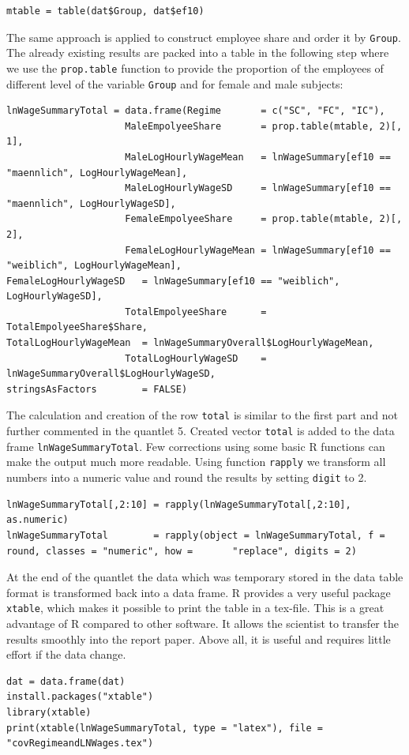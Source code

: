 \lstset{firstnumber = 347} 
\begin{lstlisting}
mtable = table(dat$Group, dat$ef10)                                            
\end{lstlisting}
The same approach is applied to construct employee share and order it by \texttt{Group}. The already existing results are packed into a table in the following step where we use the \texttt{prop.table} function to provide the proportion of the employees of different level of the variable \texttt{Group} and for female and male subjects:
\lstset{firstnumber = 356} 
\begin{lstlisting}
lnWageSummaryTotal = data.frame(Regime       = c("SC", "FC", "IC"),                                   
                     MaleEmpolyeeShare       = prop.table(mtable, 2)[, 1],  
                     MaleLogHourlyWageMean   = lnWageSummary[ef10 == "maennlich", LogHourlyWageMean],    
                     MaleLogHourlyWageSD     = lnWageSummary[ef10 == "maennlich", LogHourlyWageSD],       
                     FemaleEmpolyeeShare     = prop.table(mtable, 2)[, 2],                             
                     FemaleLogHourlyWageMean = lnWageSummary[ef10 == "weiblich", LogHourlyWageMean],                            FemaleLogHourlyWageSD   = lnWageSummary[ef10 == "weiblich", LogHourlyWageSD],     
                     TotalEmpolyeeShare      = TotalEmpolyeeShare$Share,                                                        TotalLogHourlyWageMean  = lnWageSummaryOverall$LogHourlyWageMean,                
                     TotalLogHourlyWageSD    = lnWageSummaryOverall$LogHourlyWageSD,                                            stringsAsFactors        = FALSE)                                          
\end{lstlisting}
The calculation and creation of the row \texttt{total} is similar to the first part and not further commented in the quantlet 5. Created vector \texttt{total} is added to the data frame \texttt{lnWageSummaryTotal}. Few corrections using some basic R functions can make the output much more readable. Using function \texttt{rapply} we transform all numbers into a numeric value and round the results by setting \texttt{digit} to 2.
\lstset{firstnumber = 401} 
\begin{lstlisting}
lnWageSummaryTotal[,2:10] = rapply(lnWageSummaryTotal[,2:10], as.numeric)
lnWageSummaryTotal        = rapply(object = lnWageSummaryTotal, f = round, classes = "numeric", how =       "replace", digits = 2)
\end{lstlisting}
At the end of the quantlet the data which was temporary stored in the data table format is transformed back into a data frame. R provides a very useful package \texttt{xtable}, which makes it possible to print the table in a tex-file. This is a great advantage of R compared to other software. It allows the scientist to transfer the results smoothly into the report paper. Above all, it is useful and requires little effort if the data change. 
\lstset{firstnumber = 405} 
\begin{lstlisting}
dat = data.frame(dat)   
install.packages("xtable")
library(xtable)
print(xtable(lnWageSummaryTotal, type = "latex"), file = "covRegimeandLNWages.tex")
\end{lstlisting}

